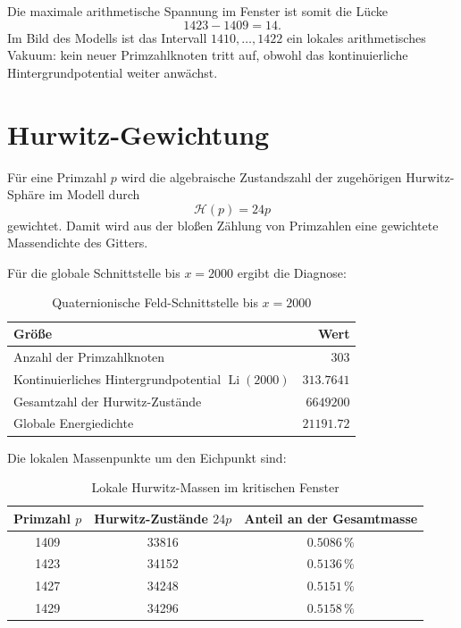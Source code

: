 \documentclass[11pt,a4paper]{article}
\newcommand{\Li}{\operatorname{Li}}
\newcommand{\HurwitzStates}{\mathcal{H}}
\begin{document}
Die maximale arithmetische Spannung im Fenster ist somit die Lücke
\[
  1423-1409=14.
\]
Im Bild des Modells ist das Intervall \(1410,\dots,1422\) ein lokales
arithmetisches Vakuum: kein neuer Primzahlknoten tritt auf, obwohl das
kontinuierliche Hintergrundpotential weiter anwächst.

\section{Hurwitz-Gewichtung}

Für eine Primzahl \(p\) wird die algebraische Zustandszahl der zugehörigen
Hurwitz-Sphäre im Modell durch
\[
  \HurwitzStates(p)=24p
\]
gewichtet. Damit wird aus der bloßen Zählung von Primzahlen eine gewichtete
Massendichte des Gitters.

Für die globale Schnittstelle bis \(x=2000\) ergibt die Diagnose:

\begin{table}[htbp]
\centering
\caption{Quaternionische Feld-Schnittstelle bis \(x=2000\)}
\begin{tabular}{@{}lr@{}}
\toprule
Größe & Wert \\
\midrule
Anzahl der Primzahlknoten & \(303\) \\
Kontinuierliches Hintergrundpotential \(\Li(2000)\) & \(\num{313.7641}\) \\
Gesamtzahl der Hurwitz-Zustände & \(\num{6649200}\) \\
Globale Energiedichte & \(\num{21191.72}\) \\
\bottomrule
\end{tabular}
\end{table}

Die lokalen Massenpunkte um den Eichpunkt sind:

\begin{table}[htbp]
\centering
\caption{Lokale Hurwitz-Massen im kritischen Fenster}
\begin{tabular}{@{}ccc@{}}
\toprule
Primzahl \(p\) & Hurwitz-Zustände \(24p\) & Anteil an der Gesamtmasse \\
\midrule
1409 & 33816 & \(\num{0.5086}\,\%\) \\
1423 & 34152 & \(\num{0.5136}\,\%\) \\
1427 & 34248 & \(\num{0.5151}\,\%\) \\
1429 & 34296 & \(\num{0.5158}\,\%\) \\
\bottomrule
\end{tabular}
\end{table}
\end{document}
